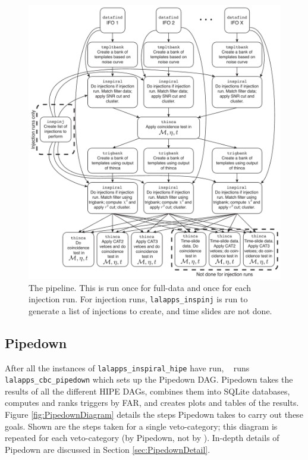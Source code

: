 \begin{figure}[p]
\begin{center}
\includegraphics[width=6in]{figures/HIPEDiagram.pdf}
\end{center}
\caption{
The \hipe pipeline. This is run once for full-data and once for
each injection run. For injection runs, \texttt{lalapps\_inspinj} is run to
generate a list of injections to create, and time slides are not done.
}
\label{fig:HIPEDiagram}
\end{figure}

\subsection{Pipedown}
\label{sec:pipedown_overview}

After all the instances of \texttt{lalapps\_inspiral\_hipe} have run, \ihope~
runs \\ \texttt{lalapps\_cbc\_pipedown} which sets up the Pipedown \ac{DAG}.
Pipedown takes the results of all the different HIPE \acp{DAG}, combines them into
SQLite databases, computes and ranks triggers by \ac{FAR}, and creates plots
and tables of the results. Figure \ref{fig:PipedownDiagram} details the steps
Pipedown takes to carry out these goals. Shown are the steps taken for a single
veto-category; this diagram is repeated for each veto-category (by Pipedown, not
by \ihope). In-depth details of Pipedown are discussed in Section
\ref{sec:PipedownDetail}.

